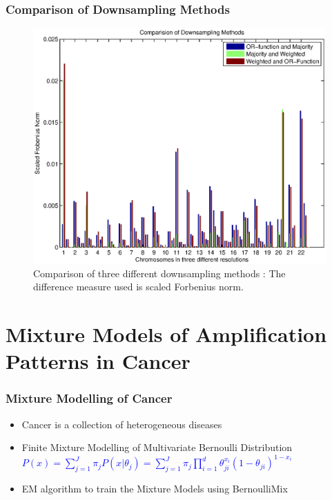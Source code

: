 \documentclass[dvips]{beamer}
\begin{document}
\begin{frame}
\frametitle{Comparison of Downsampling Methods}
\begin{figure}
\includegraphics[height=5.3 cm]{figures/frobenius}
\caption{Comparison of three different downsampling methods : The difference measure used is scaled Forbenius norm.}
\end{figure}
\end{frame}

\section[Mixture Model]{Mixture Models of Amplification Patterns in Cancer}
\begin{frame}  \frametitle{Mixture Modelling of Cancer} 
\begin{itemize}
    \item Cancer is a collection of heterogeneous diseases     
    \item Finite Mixture Modelling of Multivariate Bernoulli Distribution \\  
    \vspace{0.1cm}  
\textcolor{blue} { $ P(x) = \sum _{j=1}^{J} \pi _{j} P(x|\theta _{j}) = \sum _{j=1}^{J} \pi _{j} \prod _{i=1}^{d} \theta_{ji}^{x_i}(1-\theta _{ji})^{1-x_{i}}$ } \\
      \vspace{0.1cm}    
     \item EM algorithm to train the Mixture Models using BernoulliMix   
\end{itemize}
\end{frame}
\end{document}
